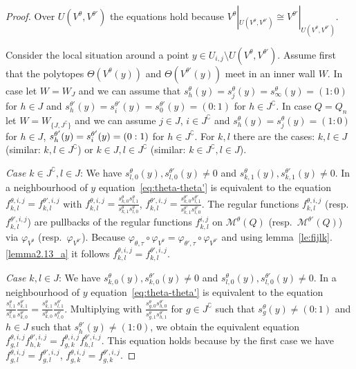 \documentclass[10pt,a4paper]{amsart}
\theoremstyle{definition}
\def\phi{\varphi}
\begin{document}
\begin{proof}
Over $U(V^\theta,V^{\theta'})$ the equations hold because
$V^\theta|_{U(V^\theta,V^{\theta'})}\cong V^{\theta'}|_{U(V^\theta,V^{\theta'})}$.

Consider the local situation around a point 
$y\in U_{i,j}\setminus U(V^\theta,V^{\theta'})$. 
Assume first that the polytopes $\Theta(V^\theta(y))$ and $\Theta(V^{\theta'}(y))$ 
meet in an inner wall $W$. 
In case %
{} let $W=W_J$ and we can assume that 
$s^\theta_h(y)=s^\theta_j(y)=s^\theta_\infty(y)=(1:0)$ for $h\in J$ and 
$s^{\theta'}_h(y)=s^{\theta'}_i(y)=s^{\theta'}_0(y)=(0:1)$ for $h\in J^\complement$. 
In case $Q=Q_n$ let $W=W_{\{J,J^\complement\}}$ and we can assume 
$j\in J$, $i\in J^\complement$ and $s^\theta_h(y)=s^\theta_j(y)=(1:0)$ 
for $h\in J$, $s^{\theta'}_h(y)=s^{\theta'}_i(y)= (0:\nobreak 1)$ for $h\in J^\complement$.
For $k,l$ there are the cases: $k,l\in J$ (similar: $k,l\in J^\complement$)
or $k\in J,l\in J^\complement$ (similar: $k\in J^\complement,l\in J$).

\emph{Case $k\in J^\complement,l\in J$}:
We have $s^\theta_{l,0}(y),s^{\theta'}_{l,0}(y)\neq0$ and 
$s^\theta_{k,1}(y),s^{\theta'}_{k,1}(y)\neq0$.
In a neighbourhood of $y$ equation~\eqref{eq:theta-theta'} is equivalent to the 
equation $f^{\theta,i,j}_{k,l}=f^{\theta',i,j}_{k,l}$ with 
$f^{\theta,i,j}_{k,l}=\frac{s^\theta_{k,0}s^\theta_{l,1}}{s^\theta_{k,1}s^\theta_{l,0}}$,
$f^{\theta',i,j}_{k,l}=\frac{s^{\theta'}_{k,0}s^{\theta'}_{l,1}}
{s^{\theta'}_{k,1}s^{\theta'}_{l,0}}$.
The regular functions $f^{\theta,i,j}_{k,l}$ (resp.\ $f^{\theta',i,j}_{k,l}$) 
are pullbacks of the regular functions $f^{i,j}_{k,l}$ on
$\mathcal M^\theta(Q)$ (resp.\ $\mathcal M^{\theta'}(Q)$) via 
$\phi_{V^\theta}$ (resp.\ $\phi_{V^{\theta'}}$). 
Because $\phi_{\theta,\tau}\circ\phi_{V^\theta}=\phi_{\theta',\tau}\circ\phi_{V^{\theta'}}$
and using lemma~\ref{le:fijlk}.\ref{lemma2.13_a} it follows $f^{\theta,i,j}_{k,l}=f^{\theta',i,j}_{k,l}$.

\emph{Case $k,l\in J$}:
We have $s^\theta_{k,0}(y),s^{\theta'}_{k,0}(y)\neq0$ and 
$s^\theta_{l,0}(y),s^{\theta'}_{l,0}(y)\neq0$.
In a neighbourhood of $y$ equation~\eqref{eq:theta-theta'} is equivalent to the equation
$\frac{s^\theta_{l,1}}{s^\theta_{l,0}}\frac{s^{\theta'}_{k,1}}{s^{\theta'}_{k,0}}
=\frac{s^\theta_{k,1}}{s^\theta_{k,0}}\frac{s^{\theta'}_{l,1}}{s^{\theta'}_{l,0}}$.
Multiplying with $\frac{s^\theta_{g,0}s^{\theta'}_{h,0}}{s^\theta_{g,1}s^{\theta'}_{h,1}}$
for $g\in J^\complement$ such that $s^\theta_g(y)\neq(0:1)$ and $h\in J$ such that 
$s^{\theta'}_h(y)\neq(1:0)$, we obtain the equivalent equation 
$f^{\theta,i,j}_{g,l}f^{\theta',i,j}_{h,k}=f^{\theta,i,j}_{g,k}f^{\theta',i,j}_{h,l}$.
This equation holds because by the first case we have 
$f^{\theta,i,j}_{g,l}=f^{\theta',i,j}_{g,l}$, $f^{\theta,i,j}_{g,k}=f^{\theta',i,j}_{g,k}$.


\end{proof}
\end{document}
